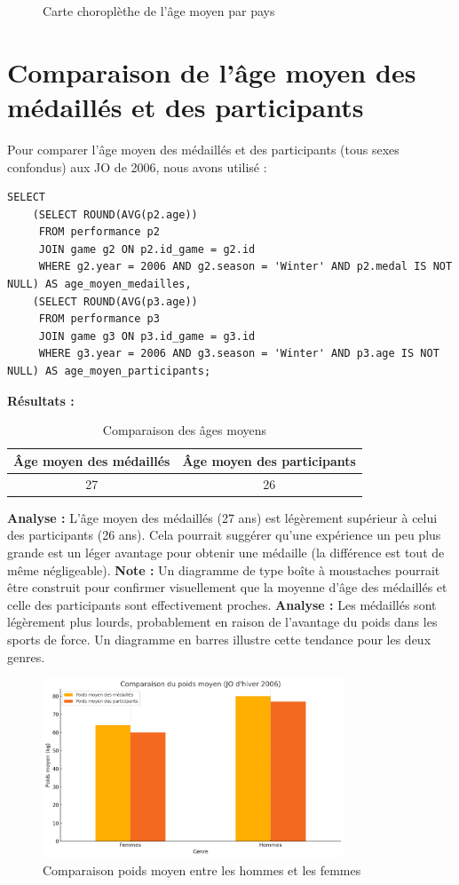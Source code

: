 \documentclass[fontsize=10pt,oneside]{scrreprt}
\begin{document}
\begin{itemize}
\begin{figure}[H]
        \caption{Carte choroplèthe de l'âge moyen par pays}
        \label{fig:age_moyen_carte}
    \end{figure}
\end{itemize}

\section{Comparaison de l'âge moyen des médaillés et des participants}
Pour comparer l'âge moyen des médaillés et des participants (tous sexes confondus) aux JO de 2006, nous avons utilisé :
\begin{verbatim}
SELECT 
    (SELECT ROUND(AVG(p2.age)) 
     FROM performance p2 
     JOIN game g2 ON p2.id_game = g2.id 
     WHERE g2.year = 2006 AND g2.season = 'Winter' AND p2.medal IS NOT NULL) AS age_moyen_medailles,
    (SELECT ROUND(AVG(p3.age)) 
     FROM performance p3 
     JOIN game g3 ON p3.id_game = g3.id 
     WHERE g3.year = 2006 AND g3.season = 'Winter' AND p3.age IS NOT NULL) AS age_moyen_participants;
\end{verbatim}
\textbf{Résultats :}
\begin{table}[H]
\centering
\caption{Comparaison des âges moyens}
\label{tab:age_moyen_medailles_participants}
\begin{tabular}{cc}
\toprule
Âge moyen des médaillés & Âge moyen des participants \\
\midrule
27                      & 26                         \\
\bottomrule
\end{tabular}
\end{table}

\textbf{Analyse :} L'âge moyen des médaillés (27 ans) est légèrement supérieur à celui des participants (26 ans). Cela pourrait suggérer qu'une expérience un peu plus grande est un léger avantage pour obtenir une médaille (la différence est tout de même négligeable). 
\textbf{Note :} Un diagramme de type boîte à moustaches pourrait être construit pour confirmer visuellement que la moyenne d'âge des médaillés et celle des participants sont effectivement proches.
\textbf{Analyse :} Les médaillés sont légèrement plus lourds, probablement en raison de l'avantage du poids dans les sports de force. Un diagramme en barres illustre cette tendance pour les deux genres.
\begin{figure}[H]
    \centering
    \includegraphics[width=0.8\textwidth]{charts/comparaisonpoidsmoyenhf.png}
    \caption{Comparaison poids moyen entre les hommes et les femmes}
    \label{fig:poids_moyen_hf}
\end{figure}
\end{document}
